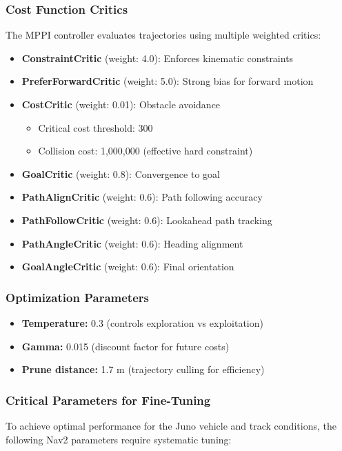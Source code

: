 \subsubsection{Cost Function Critics}
The MPPI controller evaluates trajectories using multiple weighted critics:
\begin{itemize}
    \item \textbf{ConstraintCritic} (weight: 4.0): Enforces kinematic constraints
    \item \textbf{PreferForwardCritic} (weight: 5.0): Strong bias for forward motion
    \item \textbf{CostCritic} (weight: 0.01): Obstacle avoidance
    \begin{itemize}
        \item Critical cost threshold: 300
        \item Collision cost: 1,000,000 (effective hard constraint)
    \end{itemize}
    \item \textbf{GoalCritic} (weight: 0.8): Convergence to goal
    \item \textbf{PathAlignCritic} (weight: 0.6): Path following accuracy
    \item \textbf{PathFollowCritic} (weight: 0.6): Lookahead path tracking
    \item \textbf{PathAngleCritic} (weight: 0.6): Heading alignment
    \item \textbf{GoalAngleCritic} (weight: 0.6): Final orientation
\end{itemize}

\subsubsection{Optimization Parameters}
\begin{itemize}
    \item \textbf{Temperature:} 0.3 (controls exploration vs exploitation)
    \item \textbf{Gamma:} 0.015 (discount factor for future costs)
    \item \textbf{Prune distance:} 1.7 m (trajectory culling for efficiency)
\end{itemize}

\subsubsection{Critical Parameters for Fine-Tuning}
To achieve optimal performance for the Juno vehicle and track conditions, the following Nav2 parameters require systematic tuning:

